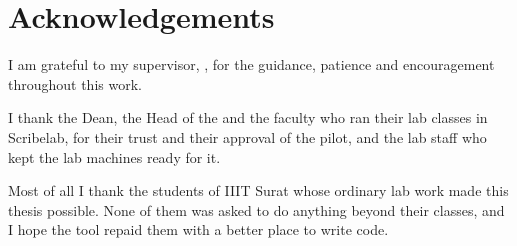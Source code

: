 \chapter*{Acknowledgements}

I am grateful to my supervisor, \supervisor, for the guidance, patience and
encouragement throughout this work.

I thank the Dean, the Head of the \department{} and the faculty who ran their
lab classes in Scribelab, for their trust and their approval of the pilot, and
the lab staff who kept the lab machines ready for it.

Most of all I thank the students of IIIT Surat whose ordinary lab work made
this thesis possible. None of them was asked to do anything beyond their
classes, and I hope the tool repaid them with a better place to write code.

